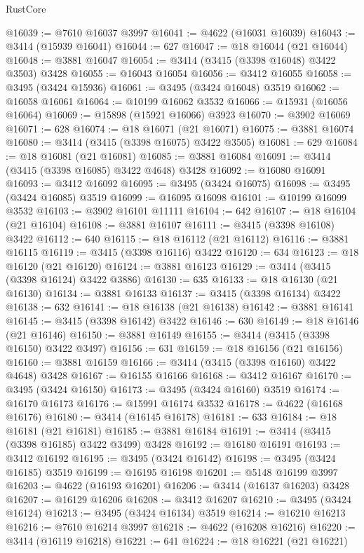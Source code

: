 \begin{lexlean}{RustCore}
\begin{coremodule}
@16039 := @7610 @16037 @3997
@16041 := @4622 (@16031 @16039)
@16043 := @3414 (@15939 @16041)
@16044 := 627
@16047 := @18 @16044 (@21 @16044)
@16048 := @3881 @16047
@16054 := @3414 (@3415 (@3398 @16048) @3422 @3503) @3428
@16055 := @16043 @16054
@16056 := @3412 @16055
@16058 := @3495 (@3424 @15936)
@16061 := @3495 (@3424 @16048) @3519
@16062 := @16058 @16061
@16064 := @10199 @16062 @3532
@16066 := @15931 (@16056 @16064)
@16069 := @15898 (@15921 @16066) @3923
@16070 := @3902 @16069
@16071 := 628
@16074 := @18 @16071 (@21 @16071)
@16075 := @3881 @16074
@16080 := @3414 (@3415 (@3398 @16075) @3422 @3505)
@16081 := 629
@16084 := @18 @16081 (@21 @16081)
@16085 := @3881 @16084
@16091 := @3414 (@3415 (@3398 @16085) @3422 @4648) @3428
@16092 := @16080 @16091
@16093 := @3412 @16092
@16095 := @3495 (@3424 @16075)
@16098 := @3495 (@3424 @16085) @3519
@16099 := @16095 @16098
@16101 := @10199 @16099 @3532
@16103 := @3902 @16101 @11111
@16104 := 642
@16107 := @18 @16104 (@21 @16104)
@16108 := @3881 @16107
@16111 := @3415 (@3398 @16108) @3422
@16112 := 640
@16115 := @18 @16112 (@21 @16112)
@16116 := @3881 @16115
@16119 := @3415 (@3398 @16116) @3422
@16120 := 634
@16123 := @18 @16120 (@21 @16120)
@16124 := @3881 @16123
@16129 := @3414 (@3415 (@3398 @16124) @3422 @3886)
@16130 := 635
@16133 := @18 @16130 (@21 @16130)
@16134 := @3881 @16133
@16137 := @3415 (@3398 @16134) @3422
@16138 := 632
@16141 := @18 @16138 (@21 @16138)
@16142 := @3881 @16141
@16145 := @3415 (@3398 @16142) @3422
@16146 := 630
@16149 := @18 @16146 (@21 @16146)
@16150 := @3881 @16149
@16155 := @3414 (@3415 (@3398 @16150) @3422 @3497)
@16156 := 631
@16159 := @18 @16156 (@21 @16156)
@16160 := @3881 @16159
@16166 := @3414 (@3415 (@3398 @16160) @3422 @4648) @3428
@16167 := @16155 @16166
@16168 := @3412 @16167
@16170 := @3495 (@3424 @16150)
@16173 := @3495 (@3424 @16160) @3519
@16174 := @16170 @16173
@16176 := @15991 @16174 @3532
@16178 := @4622 (@16168 @16176)
@16180 := @3414 (@16145 @16178)
@16181 := 633
@16184 := @18 @16181 (@21 @16181)
@16185 := @3881 @16184
@16191 := @3414 (@3415 (@3398 @16185) @3422 @3499) @3428
@16192 := @16180 @16191
@16193 := @3412 @16192
@16195 := @3495 (@3424 @16142)
@16198 := @3495 (@3424 @16185) @3519
@16199 := @16195 @16198
@16201 := @5148 @16199 @3997
@16203 := @4622 (@16193 @16201)
@16206 := @3414 (@16137 @16203) @3428
@16207 := @16129 @16206
@16208 := @3412 @16207
@16210 := @3495 (@3424 @16124)
@16213 := @3495 (@3424 @16134) @3519
@16214 := @16210 @16213
@16216 := @7610 @16214 @3997
@16218 := @4622 (@16208 @16216)
@16220 := @3414 (@16119 @16218)
@16221 := 641
@16224 := @18 @16221 (@21 @16221)

\end{coremodule}
\end{lexlean}
